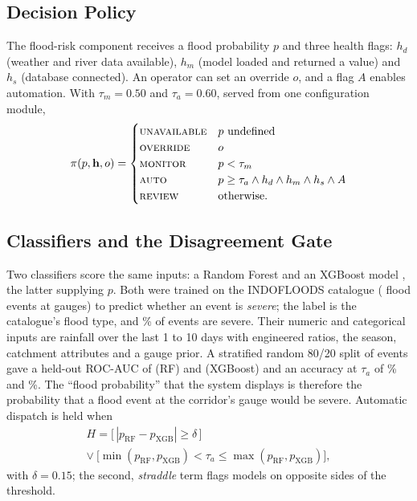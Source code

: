 \documentclass[conference]{IEEEtran}
\begin{document}
\subsection{Decision Policy}
The flood-risk component receives a flood probability $p$ and three health flags: $h_d$ (weather and river data available), $h_m$ (model loaded and returned a value) and $h_s$ (database connected). An operator can set an override $o$, and a flag $A$ enables automation. With $\tau_m=0.50$ and $\tau_a=0.60$, served from one configuration module,
\begin{equation}
\pi(p,\mathbf{h},o)=
\begin{cases}
\textsc{unavailable} & p \text{ undefined}\\
\textsc{override} & o\\
\textsc{monitor} & p<\tau_m\\
\textsc{auto} & p\ge\tau_a \wedge h_d\wedge h_m\wedge h_s\wedge A\\
\textsc{review} & \text{otherwise.}
\end{cases}
\label{eq:policy}
\end{equation}

\subsection{Classifiers and the Disagreement Gate}
Two classifiers score the same inputs: a Random Forest \cite{Breiman2001} and an XGBoost model \cite{Chen2016}, the latter supplying $p$. Both were trained on the INDOFLOODS catalogue (\ClsEvents{} flood events at \ClsGauges{} gauges) to predict whether an event is \emph{severe}; the label is the catalogue's flood type, and \ClsPos\% of events are severe. Their \ClsNum{} numeric and \ClsCat{} categorical inputs are rainfall over the last 1 to 10 days with engineered ratios, the season, catchment attributes and a gauge prior. A stratified random 80/20 split of events gave a held-out ROC-AUC of \ClsAucRf{} (RF) and \ClsAucXgb{} (XGBoost) and an accuracy at $\tau_a$ of \ClsAccRf\% and \ClsAccXgb\%. The ``flood probability'' that the system displays is therefore the probability that a flood event at the corridor's gauge would be severe. Automatic dispatch is held when
\begin{multline}
H=\big[\,|p_{\mathrm{RF}}-p_{\mathrm{XGB}}|\ge\delta\,\big]\\
\vee\ \big[\min(p_{\mathrm{RF}},p_{\mathrm{XGB}})<\tau_a\le\max(p_{\mathrm{RF}},p_{\mathrm{XGB}})\big],
\label{eq:dual}
\end{multline}
with $\delta=0.15$; the second, \emph{straddle} term flags models on opposite sides of the threshold.
\end{document}
